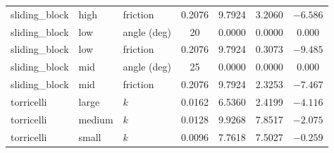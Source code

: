 \begin{table}[t]
\begin{tabular}{@{}lllS[table-format=2.4]S[table-format=2.4]S[table-format=2.4]S[table-format=-2.4]@{}}
sliding\_block & high  & friction & 0.2076 & 9.7924 & 3.2060 & $-6.586$ \\
sliding\_block & low   & angle (deg) & 20 & 0.0000 & 0.0000 & 0.000 \\
sliding\_block & low   & friction & 0.2076 & 9.7924 & 0.3073 & $-9.485$ \\
sliding\_block & mid   & angle (deg) & 25 & 0.0000 & 0.0000 & 0.000 \\
sliding\_block & mid   & friction & 0.2076 & 9.7924 & 2.3253 & $-7.467$ \\
torricelli   & large  & $k$ & 0.0162 & 6.5360 & 2.4199 & $-4.116$ \\
torricelli   & medium & $k$ & 0.0128 & 9.9268 & 7.8517 & $-2.075$ \\
torricelli   & small  & $k$ & 0.0096 & 7.7618 & 7.5027 & $-0.259$ \\
\bottomrule
\end{tabular}
\end{table}

